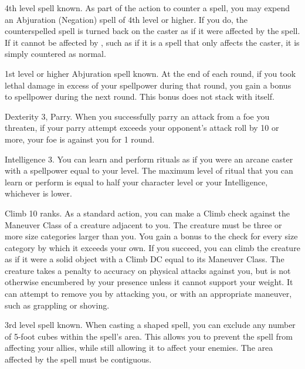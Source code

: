 \featpre 4th level spell known.
\featben As part of the action to counter a spell, you may expend an Abjuration (Negation) spell of 4th level or higher.
If you do, the counterspelled spell is turned back on the caster as if it were affected by the 
spell.
If it cannot be affected by , such as if it is a spell that only affects the caster, it is simply countered as normal.

\featpre 1st level or higher Abjuration spell known.
\featben At the end of each round, if you took lethal damage in excess of your spellpower during that round, you gain a  bonus to spellpower during the next round.
This bonus does not stack with itself.

\featpres Dexterity 3, Parry.
\featben When you successfully parry an attack from a foe you threaten, if your parry attempt exceeds your opponent's attack roll by 10 or more, your foe is  against you for 1 round.

\featpre Intelligence 3.
\featben You can learn and perform rituals as if you were an arcane caster with a spellpower equal to your level.
The maximum level of ritual that you can learn or perform is equal to half your character level or your Intelligence, whichever is lower.

\featpre Climb 10 ranks.
\featben As a standard action, you can make a Climb check against the Maneuver Class of a creature adjacent to you.
The creature must be three or more size categories larger than you.
You gain a  bonus to the check for every size category by which it exceeds your own.
If you succeed, you can climb the creature as if it were a solid object with a Climb DC equal to its Maneuver Class.
The creature takes a  penalty to accuracy on physical attacks against you, but is not otherwise encumbered by your presence unless it cannot support your weight.
It can attempt to remove you by attacking you, or with an appropriate maneuver, such as grappling or shoving.

\featpre 3rd level spell known.
\featben When casting a shaped spell, you can exclude any number of 5-foot cubes within the spell's area.
This allows you to prevent the spell from affecting your allies, while still allowing it to affect your enemies.
The area affected by the spell must be contiguous.


